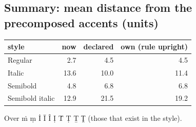 \documentclass[10pt]{article}
\begin{document}
\clearpage\subsection*{Summary: mean distance from the precomposed accents (units)}
\begin{tabular}{lrrr}style & now & declared & own (rule upright)\\\hline
Regular & 2.7 & 4.5 & 4.5\\
Italic & 13.6 & 10.0 & 11.4\\
Semibold & 4.8 & 6.8 & 6.8\\
Semibold italic & 12.9 & 21.5 & 19.2\\
\end{tabular}\par Over ṁ ṃ İ Ī Î Ị Ṫ Ṭ Ṯ Ṱ (those that exist in the style).
\end{document}
